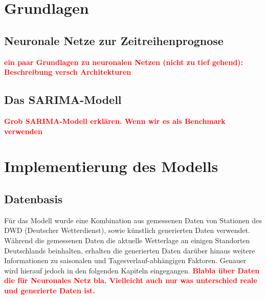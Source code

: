 \documentclass[
12pt, %
toc=listofnumbered, %
toc=chapterentrydotfill, %
numbers=noenddot, %
captions=tableheading, %
]{scrreprt}
\let\Oldsection\section
\renewcommand{\section}{\FloatBarrier\Oldsection}
\newcommand{\highlight}[1]{\textbf{\textcolor{red}{#1}}}
\begin{document}
\chapter{Grundlagen}

\section{Neuronale Netze zur Zeitreihenprognose}
\highlight{ein paar Grundlagen zu neuronalen Netzen (nicht zu tief gehend): 
Beschreibung versch Architekturen}

\section{Das SARIMA-Modell}
\highlight{Grob SARIMA-Modell erklären. Wenn wir es als Benchmark verwenden}


\chapter{Implementierung des Modells}

\section{Datenbasis}
Für das Modell wurde eine Kombination aus gemessenen Daten von Stationen des DWD (Deutscher Wetterdienst), sowie künstlich generierten Daten verwendet.
Während die gemessenen Daten die aktuelle Wetterlage an einigen Standorten Deutschlands beinhalten, erhalten die generierten Daten darüber hinaus weitere Informationen zu saisonalen und Tagesverlauf-abhängigen Faktoren. 
Genauer wird hierauf jedoch in den folgenden Kapiteln eingegangen. 
\highlight{Blabla über Daten die für Neuronales Netz bla. Vielleicht auch nur was unterschied reale und generierte Daten ist.}
\end{document}
